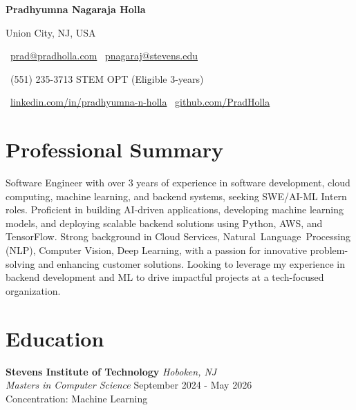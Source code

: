\documentclass[11pt,a4paper]{article}
\newcommand{\headerfont}{\sffamily\bfseries}  %
\newcommand{\headername}[1]{{\fontsize{16}{19}\headerfont #1}}  %
\begin{document}

\begin{center}
    \headername{Pradhyumna Nagaraja Holla}  %
    
    \vspace{0.3em}
    {\large Union City, NJ, USA}
    
    \vspace{0.3em}
    {\faEnvelope\ \href{mailto:prad@pradholla.com}{prad@pradholla.com} 
    \quad\textbullet\quad 
    \faEnvelope\ \href{mailto:pnagaraj@stevens.edu}{pnagaraj@stevens.edu}}
    
    \vspace{0.2em}
    {\faPhone\ (551) 235-3713 
    \quad\textbullet\quad 
    STEM OPT (Eligible 3-years)}
    
    \vspace{0.2em}
    {\faLinkedin\ \href{https://www.linkedin.com/in/pradhyumna-n-holla/}{linkedin.com/in/pradhyumna-n-holla} 
    \quad\textbullet\quad 
    \faGithub\ \href{https://github.com/PradHolla}{github.com/PradHolla}}
\end{center}
\section*{Professional Summary}
\begin{spacing}{1.1}
Software Engineer with over 3 years of experience in software development, cloud computing, machine learning, and backend 
systems, seeking \mbox{SWE/AI-ML} Intern roles. Proficient in building \mbox{AI-driven} applications, developing machine learning models, and deploying scalable backend solutions 
using Python, AWS, and \mbox{TensorFlow}. Strong background in Cloud Services, \mbox{Natural Language Processing} (NLP), Computer Vision, Deep Learning, 
with a passion for innovative \mbox{problem-solving} and enhancing customer solutions. Looking to leverage my experience in backend 
development and ML to drive impactful projects at a tech-focused organization.
\end{spacing}
\vspace{-0.5em}  %

\section*{Education}
\noindent\textbf{Stevens Institute of Technology} \hfill \textit{Hoboken, NJ}\\
\textit{Masters in Computer Science} \hfill September 2024 - May 2026\\
Concentration: Machine Learning\\
\vspace{-0.5em}
\end{document}
